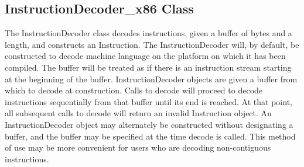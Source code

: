 \subsection{InstructionDecoder\_\-x86 Class}
\label{classDyninst_1_1InstructionAPI_1_1InstructionDecoder__x86}



The InstructionDecoder class decodes instructions, given a buffer of bytes and a length, and constructs an Instruction. The InstructionDecoder will, by default, be constructed to decode machine language on the platform on which it has been compiled. The buffer will be treated as if there is an instruction stream starting at the beginning of the buffer. InstructionDecoder objects are given a buffer from which to decode at construction. Calls to {\ttfamily decode} will proceed to decode instructions sequentially from that buffer until its end is reached. At that point, all subsequent calls to {\ttfamily decode} will return an invalid Instruction object. An InstructionDecoder object may alternately be constructed without designating a buffer, and the buffer may be specified at the time {\ttfamily decode} is called. This method of use may be more convenient for users who are decoding non-\/contiguous instructions. 